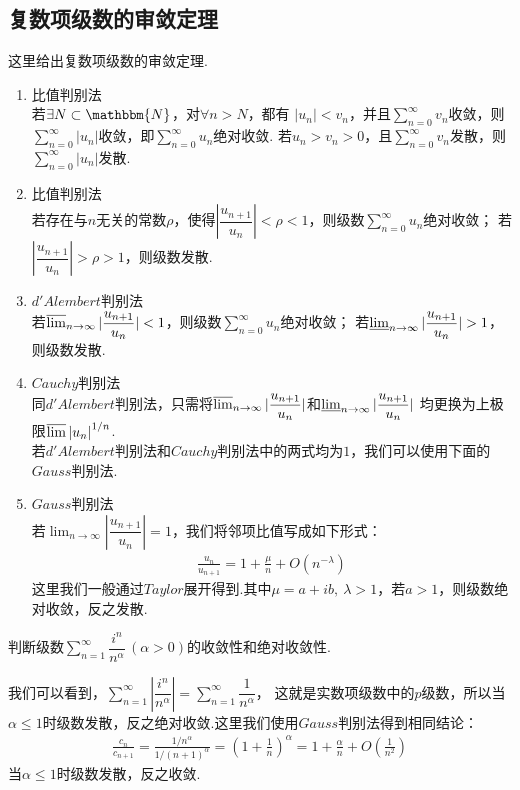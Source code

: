     \subsection{复数项级数的审敛定理}
    这里给出复数项级数的审敛定理.
    \begin{enumerate}
        \item 比值判别法\\
                若$\exists N \subset \mathbbm{N}$，对$\forall n > N$，都有
                $|u_n| < v_n$，并且$\sum_{n = 0}^{\infty}v_n$收敛，则$\sum_{n=0}^{\infty}|u_n|$收敛，即$\sum_{n=0}^{\infty}u_n$绝对收敛.
                若$u_n>v_n>0$，且$\sum_{n=0}^{\infty}v_n$发散，则$\sum_{n=0}^{\infty}|u_n|$发散.
        \item 比值判别法\\
                若存在与$n$无关的常数$\rho$，使得$\left|\dfrac{u_{n+1}}{u_n}\right|<\rho<1$，则级数$\sum_{n=0}^{\infty}u_n$绝对收敛；
                若$\left|\dfrac{u_{n+1}}{u_n}\right|>\rho>1$，则级数发散.
        \item $d'Alembert$判别法\\
                若$\varlimsup_{n\to\infty}|\dfrac{u_{n+1}}{u_n}|<1$，则级数$\sum_{n=0}^{\infty}u_n$绝对收敛；
                若$\varliminf_{n\to\infty}|\dfrac{u_{n+1}}{u_n}|>1$，则级数发散.
        \item $Cauchy$判别法\\
                同$d'Alembert$判别法，只需将$\varlimsup_{n\to\infty}|\dfrac{u_{n+1}}{u_n}|$和$\varliminf_{n\to\infty}|\dfrac{u_{n+1}}{u_n}|$
                均更换为上极限$\varlimsup{{|u_n|}^{1/n}}$.\\
                若$d'Alembert$判别法和$Cauchy$判别法中的两式均为$1$，我们可以使用下面的$Gauss$判别法.
        \item $Gauss$判别法\\
                若$\lim_{n\to\infty}|\dfrac{u_{n+1}}{u_n}|=1$，我们将邻项比值写成如下形式：
                \begin{align*}
                    \frac{u_n}{u_{n+1}}=1+\frac{\mu}{n}+O(n^{-\lambda})
                \end{align*}
                这里我们一般通过$Taylor$展开得到.其中$\mu=a+ib,\ \lambda > 1$，若$a>1$，则级数绝对收敛，反之发散.
    \end{enumerate}
    \begin{example}
        判断级数$\sum_{n=1}^{\infty}\dfrac{i^n}{n^\alpha}\,(\alpha>0)$的收敛性和绝对收敛性.
    \end{example}
    \begin{solution}
        我们可以看到，$\sum_{n=1}^{\infty}|\dfrac{i^n}{n^\alpha}|=\sum_{n=1}^{\infty}\dfrac{1}{n^\alpha}$，
        这就是实数项级数中的$p$级数，所以当$\alpha\leq 1$时级数发散，反之绝对收敛.这里我们使用$Gauss$判别法得到相同结论：
        \begin{align*}
            \frac{c_n}{c_{n+1}}=\frac{1/n^\alpha}{1/(n+1)^\alpha}=\left( 1+\frac{1}{n} \right)^\alpha=1+\frac{\alpha}{n}+O\left(\frac{1}{n^2}\right)
        \end{align*}
        当$\alpha \leq 1$时级数发散，反之收敛.
    \end{solution}

